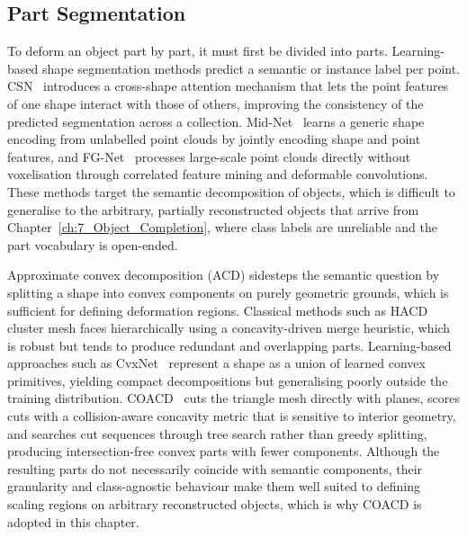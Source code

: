 \subsection{Part Segmentation}
\label{sec:8_rw_segmentation}

To deform an object part by part, it must first be divided into parts. Learning-based shape segmentation methods predict a semantic or instance label per point. CSN~\cite{loizou_cross-shape_2023} introduces a cross-shape attention mechanism that lets the point features of one shape interact with those of others, improving the consistency of the predicted segmentation across a collection. Mid-Net~\cite{wang_unsupervised_2020} learns a generic shape encoding from unlabelled point clouds by jointly encoding shape and point features, and FG-Net~\cite{liu_fg-net_2020} processes large-scale point clouds directly without voxelisation through correlated feature mining and deformable convolutions. These methods target the semantic decomposition of objects, which is difficult to generalise to the arbitrary, partially reconstructed objects that arrive from Chapter~\ref{ch:7_Object_Completion}, where class labels are unreliable and the part vocabulary is open-ended.

Approximate convex decomposition (ACD) sidesteps the semantic question by splitting a shape into convex components on purely geometric grounds, which is sufficient for defining deformation regions. Classical methods such as HACD~\cite{mamou_simple_2009} cluster mesh faces hierarchically using a concavity-driven merge heuristic, which is robust but tends to produce redundant and overlapping parts. Learning-based approaches such as CvxNet~\cite{deng_cvxnet_2020} represent a shape as a union of learned convex primitives, yielding compact decompositions but generalising poorly outside the training distribution. \gls{COACD}~\cite{wei_approximate_2022} cuts the triangle mesh directly with planes, scores cuts with a collision-aware concavity metric that is sensitive to interior geometry, and searches cut sequences through tree search rather than greedy splitting, producing intersection-free convex parts with fewer components. Although the resulting parts do not necessarily coincide with semantic components, their granularity and class-agnostic behaviour make them well suited to defining scaling regions on arbitrary reconstructed objects, which is why \gls{COACD} is adopted in this chapter.


